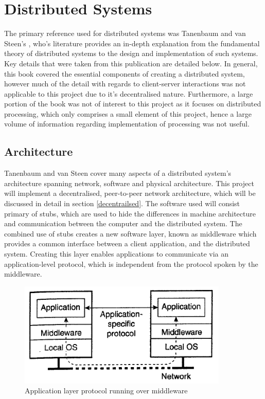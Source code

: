 \documentclass[a4paper, 11pt]{report}
\begin{document}
\section{Distributed Systems} \label{dist}
The primary reference used for distributed systems was Tanenbaum and van Steen's \cite{tanenbaumdist}, who's literature provides an in-depth explanation from the fundamental theory of distributed systems to the design and implementation of such systems. Key details that were taken from this publication are detailed below. In general, this book covered the essential components of creating a distributed system, however much of the detail with regards to client-server interactions was not applicable to this project due to it's decentralised nature. Furthermore, a large portion of the book was not of interest to this project as it focuses on distributed processing, which only comprises a small element of this project, hence a large volume of information regarding implementation of processing was not useful.

\subsection{Architecture}
Tanenbaum and van Steen cover many aspects of a distributed system's architecture spanning network, software and physical architecture. This project will implement a decentralised, peer-to-peer network architecture, which will be discussed in detail in section \ref{decentrailsed}. The software used will consist primary of \gls{stub}s, which are used to hide the differences in machine architecture and communication between the computer and the distributed system. The combined use of \gls{stub}s creates a new software layer, known as \gls{middleware} which provides a common interface between a client application, and the distributed system. Creating this layer enables applications to communicate via an application-level protocol, which is independent from the protocol spoken by the \gls{middleware}.

\begin{figure}[H]
\centering
\includegraphics[height=5cm,keepaspectratio]{appl_layer_proto}
\caption{Application layer protocol running over \gls{middleware} \cite{tanenbaumdist}} 
\label{fig:middlewarelayers}
\end{figure}
\end{document}

